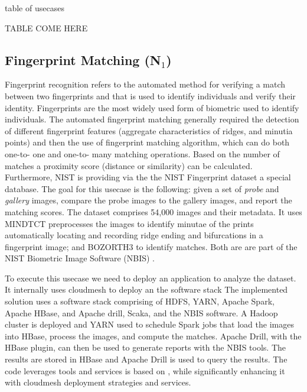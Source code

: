 \begin{table*}[htb]

\caption{table of usecases}
\label{T:usecases}

TABLE COME HERE

\end{table*}




\subsection{Fingerprint Matching (N$_1$)}

Fingerprint recognition refers to the automated method for verifying a
match between two fingerprints and that is used to identify
individuals and verify their identity. Fingerprints are the most
widely used form of biometric used to identify individuals. The
automated fingerprint matching generally required the detection of
different fingerprint features (aggregate characteristics of ridges,
and minutia points) and then the use of fingerprint matching
algorithm, which can do both one-to- one and one-to- many matching
operations. Based on the number of matches a proximity score (distance
or similarity) can be calculated. Furthermore, NIST is providing via
the the NIST Fingerprint dataset a special database. The goal for this
usecase is the following: given a set of {\it probe} and {\it gallery}
images, compare the probe images to the gallery images, and report the
matching scores.  The dataset comprises 54,000 images and their
metadata.  It uses MINDTCT \cite{mindtct} preprocesses the images
to identify minutae of the prints automatically locating and recording
ridge ending and bifurcations in a fingerprint image; and BOZORTH3
\cite{garris2001user} to identify matches. Both are are part of the NIST
Biometric Image Software (NBIS) \cite{watson2007user}.

To execute this usecase we need to deploy an application to analyze
the dataset. It internally uses cloudmesh to deploy an the software
stack The implemented \cite{nist-fingerprint}
solution uses a software stack comprising of HDFS, YARN, Apache Spark,
Apache HBase, and Apache drill, Scaka, and the NBIS software. A Hadoop
cluster is deployed and YARN used to schedule Spark jobs that load the
images into HBase, process the images, and compute the matches. Apache
Drill, with the HBase plugin, can then be used to generate reports
with the NBIS tools\cite{watson2007user}. The results are stored in HBase and
Apache Drill \cite{??} is used to query the results.  The code
leverages tools and services is based on \cite{??}   , while significantly
enhancing it with cloudmesh deployment strategies and services.

